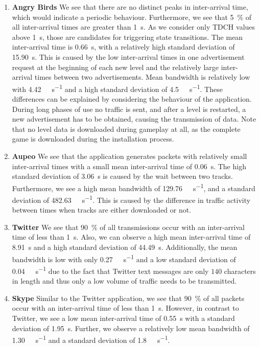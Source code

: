 \begin{enumerate}
\item \textbf{Angry Birds}
We see that there are no distinct peaks in inter-arrival time, which would indicate a periodic behaviour.
Furthermore, we see that \SI{5}{\percent} of all inter-arrival times are greater than \SI{1}{\second}.
As we consider only \gls{TDCH} values above \SI{1}{\second}, those are candidates for triggering state transitions.
The mean inter-arrival time is \SI{0.66}{\second}, with a relatively high standard deviation of \SI{15.90}{\second}.
This is caused by the low inter-arrival times in one advertisement request at the beginning of each new level and the relatively large inter-arrival times between two advertisements.
Mean bandwidth is relatively low with \SI{4.42}{\kilo\bit\per\second} and a high standard deviation of \SI{4.5}{\kilo\bit\per\second}.
These differences can be explained by considering the behaviour of the application.
During long phases of use no traffic is sent, and after a level is restarted, a new advertisement has to be obtained, causing the transmission of data.
Note that no level data is downloaded during gameplay at all, as the complete game is downloaded during the installation process.

\item \textbf{Aupeo} We see that the application generates packets with relatively small inter-arrival times with a small mean inter-arrival time of \SI{0.06}{\second}.
The high standard deviation of \SI{3.06}{\second} is caused by the wait between two tracks.
Furthermore, we see a high mean bandwidth of \SI{129.76}{\kilo\bit\per\second}, and a standard deviation of \SI{482.63}{\kilo\bit\per\second}.
This is caused by the difference in traffic activity between times when tracks are either downloaded or not.

\item \textbf{Twitter} We see that \SI{90}{\percent} of all transmissions occur with an inter-arrival time of less than \SI{1}{\second}.
Also, we can observe a high mean inter-arrival time of \SI{8.91}{\second} and a high standard deviation of \SI{44.49}{\second}.
Additionally, the mean bandwidth is low with only \SI{0.27}{\kilo\bit\per\second} and a low standard deviation of \SI{0.04}{\kilo\bit\per\second} due to the fact that Twitter text messages are only \(140\) characters in length and thus only a low volume of traffic needs to be transmitted.

\item \textbf{Skype} Similar to the Twitter application, we see that \SI{90}{\%} of all packets occur with an inter-arrival time of less than \SI{1}{\second}.
However, in contrast to Twitter, we see a low mean inter-arrival time of \SI{0.55}{\second} with a standard deviation of \SI{1.95}{\second}.
Further, we observe a relatively low mean bandwidth of \SI{1.30}{\kilo\bit\per\second} and a standard deviation of \SI{1.8}{\kilo\bit\per\second}.
\end{enumerate}

